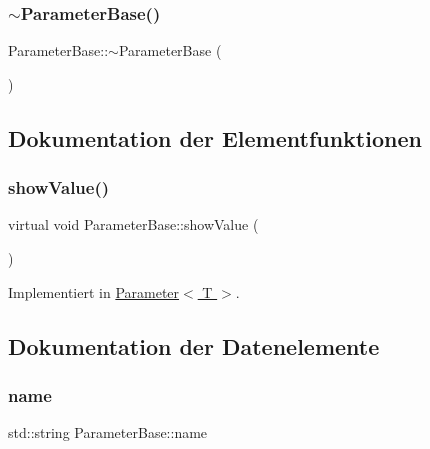 \subsubsection{\texorpdfstring{$\sim$\+Parameter\+Base()}{~ParameterBase()}}
{\footnotesize\ttfamily Parameter\+Base\+::$\sim$\+Parameter\+Base (\begin{DoxyParamCaption}{ }\end{DoxyParamCaption})\hspace{0.3cm}{\ttfamily [virtual]}}



\subsection{Dokumentation der Elementfunktionen}
\hypertarget{class_parameter_base_ad09b4d79a05987d903a7d97e16649df7}{}\label{class_parameter_base_ad09b4d79a05987d903a7d97e16649df7} 
\subsubsection{\texorpdfstring{show\+Value()}{showValue()}}
{\footnotesize\ttfamily virtual void Parameter\+Base\+::show\+Value (\begin{DoxyParamCaption}{ }\end{DoxyParamCaption})\hspace{0.3cm}{\ttfamily [pure virtual]}}



Implementiert in \hyperlink{class_parameter_ab0091864db90216ee76ee9084422b380}{Parameter$<$ T $>$}.



\subsection{Dokumentation der Datenelemente}
\hypertarget{class_parameter_base_a3e2e2ad34b89eabb0484b3a338133614}{}\label{class_parameter_base_a3e2e2ad34b89eabb0484b3a338133614} 
\subsubsection{\texorpdfstring{name}{name}}
{\footnotesize\ttfamily std\+::string Parameter\+Base\+::name}

\hypertarget{class_parameter_base_a5fabd899cfe1b654e5ff3e93145dd461}{}\label{class_parameter_base_a5fabd899cfe1b654e5ff3e93145dd461} 
